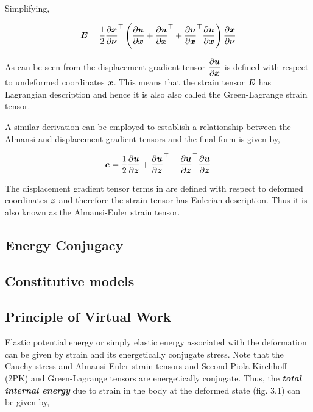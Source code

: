 \noindent Simplifying,

\begin{equation}
  \matr{E}=\frac{1}{2}\transpose{\delby{\vect{x}}{\vect{\nu}}}
           \pbrac{\delby{\vect{u}}{\vect{x}}+\transpose{\delby{\vect{u}}{\vect{x}}}+
	   \transpose{\delby{\vect{u}}{\vect{x}}}\delby{\vect{u}}{\vect{x}}}
	   \delby{\vect{x}}{\vect{\nu}}
  \label{eqn:greendisplacement2}
\end{equation}
 
As can be seen from  the displacement gradient
tensor $\delby{\vect{u}}{\vect{x}}$ is defined with respect to undeformed
coordinates $\vect{x}$. This means that the strain tensor $\matr{E}$ has
Lagrangian description and hence it is also also called the Green-Lagrange
strain tensor.
 
A similar derivation can be employed to establish a relationship between the
Almansi and displacement gradient tensors and the final form is given by,

\begin{equation}
  \vect{e}=\frac{1}{2}\delby{\vect{u}}{\vect{z}}+\transpose{\delby{\vect{u}}{\vect{z}}}-
	   \transpose{\delby{\vect{u}}{\vect{z}}}\delby{\vect{u}}{\vect{z}}
  \label{eqn:almansidisplacement}
\end{equation}
 
The displacement gradient tensor terms in  are defined with respect to deformed coordinates $\vect{z}$ and
therefore the strain tensor has Eulerian description. Thus it is also known as the Almansi-Euler strain tensor.

\subsection{Energy Conjugacy}



\subsection{Constitutive models}



\subsection{Principle of Virtual Work}
Elastic potential energy or simply elastic energy associated with the
deformation can be given by strain and its energetically conjugate stress.
Note that the Cauchy stress and Almansi-Euler strain tensors and Second
Piola-Kirchhoff (2PK) and Green-Lagrange tensors are energetically
conjugate. Thus, the \textit{\textbf{total internal energy}} due to strain in
the body at the deformed state (fig. 3.1) can be given by,
 
